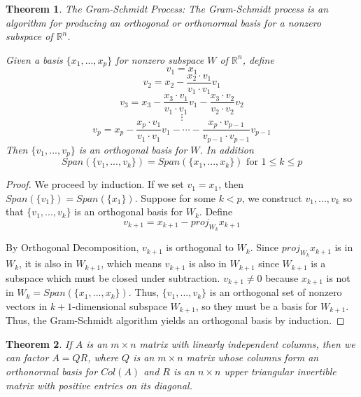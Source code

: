 \documentclass[letterpaper]{article}
\newtheorem{theorem}{Theorem}
\theoremstyle{definition}
\begin{document}
\begin{theorem}{The Gram-Schmidt Process: }
The Gram-Schmidt process is an algorithm for producing an orthogonal or orthonormal basis for a nonzero subspace of $\mathbb{R}^n$. 

Given a basis $\{ x_1, ..., x_p\}$ for nonzero subspace $W$ of $\mathbb{R}^n$, define 
$$v_1 = x_1$$
$$v_2 = x_2 - \frac{x_2 \cdot v_1}{v_1 \cdot v_1} v_1$$
$$v_3 = x_3 - \frac{x_3 \cdot v_1}{v_1 \cdot v_1} v_1 - \frac{x_3 \cdot v_2}{v_2 \cdot v_2} v_2$$
$$\vdots$$
$$v_p = x_p - \frac{x_p \cdot v_1}{v_1 \cdot v_1} v_1 - \cdots - \frac{x_p \cdot v_{p-1}}{v_{p-1} \cdot v_{p-1}} v_{p - 1}$$
Then $\{v_1 , ..., v_p\}$ is an orthogonal basis for $W$. In addition
$$Span(\{v_1 , ..., v_k\}) = Span(\{x_1, ..., x_k\}) \text{ for } 1 \leq k \leq p$$
\end{theorem}

\begin{proof}
We proceed by induction. If we set $v_1 = x_1$, then $Span(\{v_1\}) = Span(\{x_1\})$. Suppose for some $k < p$, we construct $v_1 ,..., v_k$ so that $\{ v_1, ..., v_k\}$ is an orthogonal basis for $W_{k}$. Define
$$v_{k+1} = x_{k+1} - proj_{W_k} x_{k+1}$$

By Orthogonal Decomposition, $v_{k+1}$ is orthogonal to $W_k$. Since $proj_{W_k} x_{k+1}$ is in $W_k$, it is also in $W_{k+1}$, which means $v_{k+1}$ is also in $W_{k+1}$ since $W_{k+1}$ is a subspace which must be closed under subtraction. $v_{k+1} \neq 0$ because $x_{k+1}$ is not in $W_k = Span(\{x_1 , ..., x_k\})$. Thus, $\{v_1, ..., v_k\}$ is an orthogonal set of nonzero vectors in $k+1$-dimensional subspace $W_{k+1}$, so they must be a basis for $W_{k+1}$. Thus, the Gram-Schmidt algorithm yields an orthogonal basis by induction. 
\end{proof}

\begin{theorem}
If $A$ is an $m \times n$ matrix with linearly independent columns, then we can factor $A = QR$, where $Q$ is an $m \times n$ matrix whose columns form an orthonormal basis for $Col(A)$ and $R$ is an $n \times n$ upper triangular invertible matrix with positive entries on its diagonal. 
\end{theorem}
\end{document}
